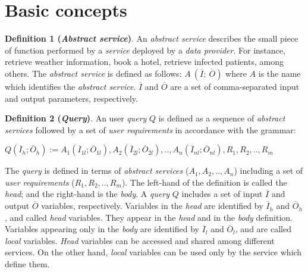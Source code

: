 \section{Basic concepts}



\noindent \textbf{Definition 1 (\textsl{Abstract service})}. An \textsl{abstract service} describes the small piece of function performed by a \textsl{service} deployed by a \textsl{data provider}. For instance, retrieve weather information, book a hotel, retrieve infected patients, among others. The \textsl{abstract service} is defined as follows: $A \ (\overline{I}; \ \overline{O})$ where $A$ is the name which identifies the \textsl{abstract service}. $\overline{I}$ and $\overline{O}$ are a set of comma-separated input and output parameters, respectively.

\bigskip
\noindent \textbf{Definition 2 (\textsl{Query})}.
An user \textsl{query} $Q$ is defined as a sequence of \textsl{abstract services} followed by a set of \textsl{user requirements} in accordance with the grammar:
%
\begin{center}
\begin{math}
Q (\overline{I}_{h}; \overline{O}_{h}) := A_{1}(\overline{I}_{1l};
\overline{O}_{1l}), A_{2}(\overline{I}_{2l}; \overline{O}_{2l}), ..,  A_{n}(\overline{I}_{nl}; \overline{O}_{nl}),R_{1},R_{2}, .., R_{m}
\end{math}
\end{center}
%
The \textsl{query} is defined in terms of \textsl{abstract services} ($A_{1}, A_{2}, .., A_{n}$) including a set of \textsl{user requirements} ($R_{1},R_{2}, .., R_{m}$). 
The left-hand of the definition is called the \textit{head}; and the right-hand is the \textit{body}. 
A \textsl{query} $Q$ includes a set of input $\overline{I}$ and output $\overline{O}$ variables, respectively.
Variables in the \textit{head} are identified by $\overline{I}_{h}$ and $\overline{O}_{h}$, and called \textit{head} variables. 
They appear in the \textit{head} and in the \textit{body} definition. 
Variables appearing only in the \textit{body} are identified by $\overline{I}_{l}$ and $\overline{O}_{l}$, and are called \textit{local} variables. \textit{Head} variables can be accessed and shared among different services. On the other hand, \textit{local} variables can be used only by the service which define them.
%

